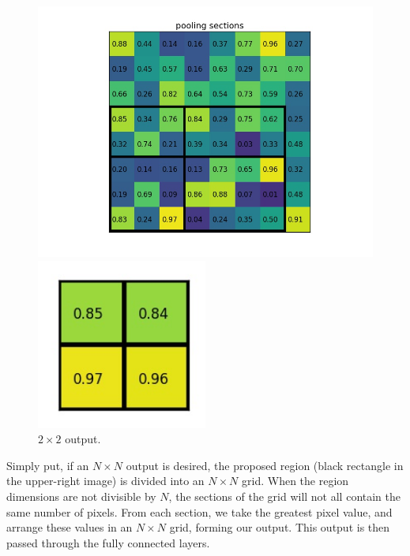 \begin{figure}[htbp]
	\centering
	\begin{minipage}{0.5\textwidth}
		\centering
		\includegraphics[width=1.1\textwidth]{images/roipool3.jpg} %
	\end{minipage}\hfill
	\begin{minipage}{0.5\textwidth}
		\centering
		\includegraphics[width=0.5\textwidth]{images/roipool4.jpg} %
		\caption{$2\times2$ output.}
	\end{minipage}
\end{figure}

Simply put, if an $N\times N$ output is desired, the proposed region (black rectangle in the upper-right image) is divided into an $N\times N$ grid. When the region dimensions are not divisible by $N$, the sections of the grid will not all contain the same number of pixels. From each section, we take the greatest pixel value, and arrange these values in an $N\times N$ grid, forming our output. This output is then passed through the fully connected layers.


